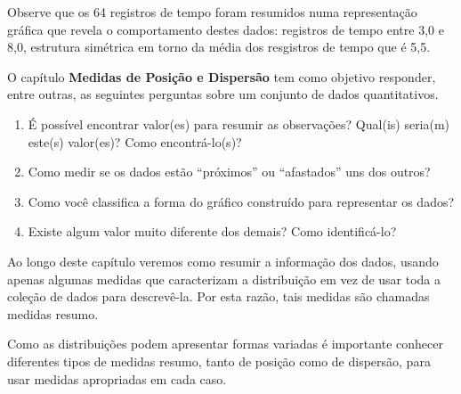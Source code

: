 Observe que os 64 registros de tempo foram resumidos numa representação gráfica que revela o comportamento destes dados: registros de tempo entre 3,0 e 8,0, estrutura simétrica em torno da média dos resgistros de tempo que é 5,5.

O capítulo \textbf{Medidas de Posição e Dispersão} tem como objetivo responder, entre outras, as seguintes perguntas sobre um conjunto de dados quantitativos.
\begin{enumerate}
\item {} 
É possível encontrar valor(es) para resumir as observações? Qual(is) seria(m) este(s) valor(es)? Como encontrá-lo(s)?

\item {} 
Como medir se os dados estão “próximos” ou “afastados” uns dos outros?

\item {} 
Como você classifica a forma do gráfico construído para representar os dados?

\item {} 
Existe algum valor muito diferente dos demais? Como identificá-lo?

\end{enumerate}

Ao longo deste capítulo veremos como resumir a informação dos dados, usando apenas algumas medidas que caracterizam a distribuição em vez de usar toda a coleção de dados para descrevê-la. Por esta razão, tais medidas são chamadas medidas resumo.

Como as distribuições podem apresentar formas variadas é importante conhecer diferentes tipos de medidas resumo, tanto de posição como de dispersão, para usar medidas apropriadas em cada caso.

